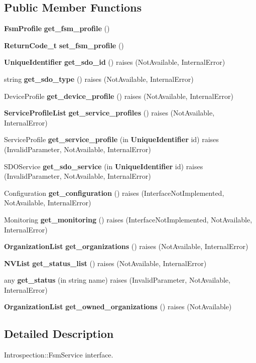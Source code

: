 \subsection*{Public Member Functions}
\begin{CompactItemize}
\item 
{\bf Fsm\-Profile} {\bf get\_\-fsm\_\-profile} ()
\item 
{\bf Return\-Code\_\-t} {\bf set\_\-fsm\_\-profile} ()
\item 
{\bf Unique\-Identifier} {\bf get\_\-sdo\_\-id} ()  raises (Not\-Available, Internal\-Error)
\item 
string {\bf get\_\-sdo\_\-type} ()  raises (Not\-Available, Internal\-Error)
\item 
Device\-Profile {\bf get\_\-device\_\-profile} ()  raises (Not\-Available, Internal\-Error)
\item 
{\bf Service\-Profile\-List} {\bf get\_\-service\_\-profiles} ()  raises (Not\-Available, Internal\-Error)
\item 
Service\-Profile {\bf get\_\-service\_\-profile} (in {\bf Unique\-Identifier} id)  raises (Invalid\-Parameter, Not\-Available, Internal\-Error)
\item 
SDOService {\bf get\_\-sdo\_\-service} (in {\bf Unique\-Identifier} id)  raises (Invalid\-Parameter, Not\-Available, Internal\-Error)
\item 
Configuration {\bf get\_\-configuration} ()  raises (Interface\-Not\-Implemented, Not\-Available, Internal\-Error)
\item 
Monitoring {\bf get\_\-monitoring} ()  raises (Interface\-Not\-Implemented, Not\-Available, Internal\-Error)
\item 
{\bf Organization\-List} {\bf get\_\-organizations} ()  raises (Not\-Available, Internal\-Error)
\item 
{\bf NVList} {\bf get\_\-status\_\-list} ()  raises (Not\-Available, Internal\-Error)
\item 
any {\bf get\_\-status} (in string name)  raises (Invalid\-Parameter, Not\-Available, Internal\-Error)
\item 
{\bf Organization\-List} {\bf get\_\-owned\_\-organizations} ()  raises (Not\-Available)
\end{CompactItemize}


\subsection{Detailed Description}
Introspection::Fsm\-Service interface. 



